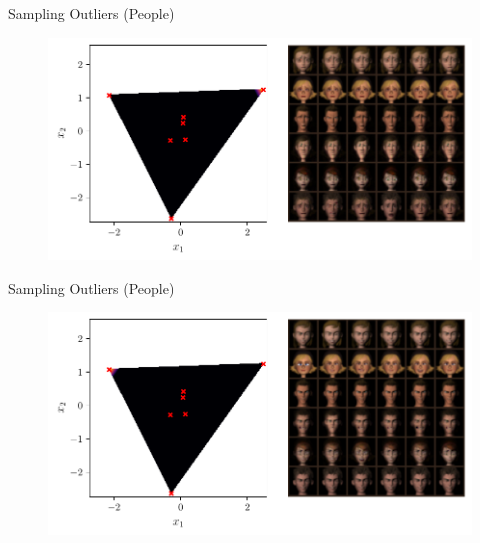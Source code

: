 \documentclass[aspectratio=169]{beamer}
\begin{document}
\begin{frame}{Sampling Outliers (People)}
\begin{figure}[htpb]
	\includegraphics[height=0.7\textheight]{figures/samples/aa_ferg2.pdf}
\end{figure}
\end{frame}

\begin{frame}{Sampling Outliers (People)}
\begin{figure}[htpb]
	\includegraphics[height=0.7\textheight]{figures/samples/aa_ferg3.pdf}
\end{figure}
\end{frame}
\end{document}
